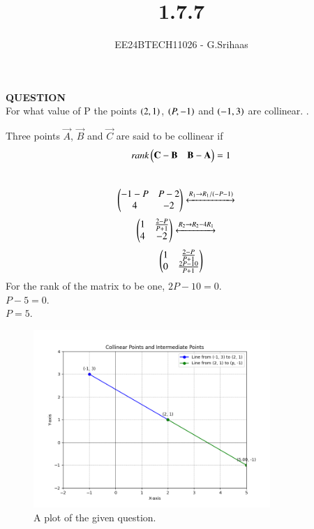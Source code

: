 \documentclass[journal]{IEEEtran}
\begin{document}

\vspace{3cm}

\title{1.7.7}
\author{EE24BTECH11026 - G.Srihaas}
{\let\newpage\relax\maketitle}

\renewcommand{\thefigure}{\theenumi}
\renewcommand{\thetable}{\theenumi}
\setlength{\intextsep}{10pt} %


\renewcommand{\thetable}{\theenumi}

\textbf{QUESTION} \\
For what value of P  the points $\left(2,1\right)$, $\left(P,-1\right)$ and $\left(-1,3\right)$ are collinear. \hfill{}.\\
\solution
 

Three points $\vec{A}$, $\vec{B}$ and $\vec{C}$ are said to be collinear if $$\emph{rank}\begin{pmatrix}\mathbf{C}-\mathbf{B} & \mathbf{B} - \mathbf{A}\end{pmatrix} = 1 $$ \\
\begin{align}
\begin{pmatrix} -1-P & P-2 \\
         4 & -2 \end{pmatrix} 
\xleftrightarrow[]{R_1 \rightarrow {R_1/(-P-1)}}\quad
\end{align}
\begin{align}
\begin{pmatrix} 1 & \frac{2-P}{P+1} \\
         4 & -2 \end{pmatrix} 
\xleftrightarrow[]{R_2 \rightarrow {R_2-4R_1}}\quad
\end{align}
\begin{align}
\begin{pmatrix} 1 & \frac{2-P}{P+1} \\
         0 & \frac{2P-10}{P+1} \end{pmatrix} 
\end{align}
For the rank of the matrix to be one, $2P-10=0$.\\
$P-5=0$.\\
$P=5$.


\begin{figure}[ht]
	\centering
	\includegraphics[width=0.8\textwidth]{figs/fig.png}
	\caption{A plot of the given question.}
	\label{fig:Plot1}
\end{figure}

	
\end{document}
